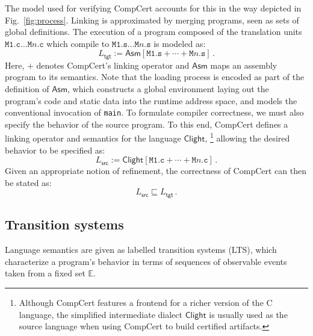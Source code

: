\documentclass[draft,11pt]{report}
\theoremstyle{definition}
\newcommand{\kw}[1]{\ensuremath{ \mathsf{#1} }}
\newcommand{\refby}{\sqsubseteq} %
\begin{document}
The model used for verifying CompCert accounts for this
in the way depicted in Fig.~\ref{fig:process}.
Linking is approximated by
merging programs, seen as sets of global definitions.
The execution
of a program composed of the translation units
$\texttt{M1.c} \ldots \texttt{M$n$.c}$
which compile to
$\texttt{M1.s} \ldots \texttt{M$n$.s}$
is modeled as:
\[
    L_\kw{tgt} :=
    \kw{Asm}[\texttt{M1.s} +
             \cdots +
             \texttt{M$n$.s}] \,.
\]
Here,
$+$ denotes CompCert's linking operator and
$\kw{Asm}$ maps an assembly program to its semantics.
Note that the loading process is encoded
as part of the definition of $\kw{Asm}$,
which constructs a global environment
laying out the program's code and static data
into the runtime address space,
and models the conventional invocation of \texttt{main}.
To formulate compiler correctness,
we must also specify the behavior of the source program.
To this end,
CompCert defines a linking operator
and semantics
for the language $\kw{Clight}$,%
\footnote{
  Although CompCert features a frontend for a richer version
  of the C language,
  the simplified intermediate dialect \kw{Clight}
  is usually used as the source language
  when using CompCert to build certified artifacts.
}
allowing the desired behavior to be specified as:
\[
    L_\kw{src} :=
    \kw{Clight}[\texttt{M1.c} + \cdots + \texttt{M$n$.c}] \,.
\]
Given an appropriate notion of refinement,
the correctness of CompCert
can then be stated as:
\[
  L_\kw{src} \refby L_\kw{tgt}
  \,.
\]


\subsection{Transition systems} %

Language semantics are
given as labelled transition systems (LTS),
which characterize a program's behavior in terms of
sequences of observable events
taken from a fixed set $\mathbb{E}$.
\end{document}
